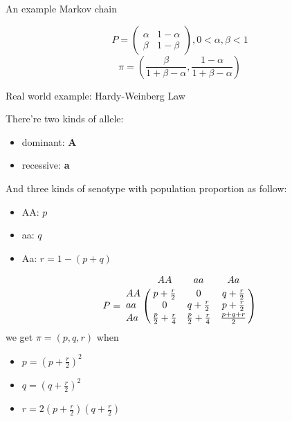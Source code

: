 \documentclass{beamer}
\begin{document}
\begin{frame}{An example Markov chain}
	\begin{example}
		\[
		P = 
		\begin{pmatrix}
			\alpha & 1 - \alpha \\
			\beta  & 1 - \beta
		\end{pmatrix},
		0 < \alpha, \beta < 1
		\]
		\[
		\pi = \left( \frac{\beta}{1+\beta-\alpha}, \frac{1-\alpha}{1+\beta-\alpha} \right) 
		\]
	\end{example}
\end{frame}

\begin{frame}{Real world example: Hardy-Weinberg Law}
	\begin{example}
		There're two kinds of allele: 
		\begin{itemize}
			\item dominant: \textbf{A}
			\item recessive: \textbf{a}
		\end{itemize}
		And three kinds of senotype with population proportion as follow:
		\begin{itemize}
			\item AA: $p$
			\item aa: $q$
			\item Aa: $r = 1 - (p + q)$
		\end{itemize}
	\end{example}
\end{frame}

\begin{frame}
	\begin{example}[cont.]
		\[
		P = 
		\bordermatrix{ ~ & AA                      & aa                      & Aa            \cr
			            AA & p+\frac{r}{2}           & 0                       & q+\frac{r}{2} \cr
			            aa & 0                       & q+\frac{r}{2}           & p+\frac{r}{2} \cr
			            Aa & \frac{p}{2}+\frac{r}{4} & \frac{p}{2}+\frac{r}{4} & \frac{p+q+r}{2} \cr}
		\]
		we get $\pi = (p, q, r)$ when
		\begin{itemize}
			\item $p = {\left( p + \frac{r}{2} \right)}^2$
			\item $q = {\left( q + \frac{r}{2} \right)}^2$
			\item $r = 2 \left( p + \frac{r}{2} \right)\left( q + \frac{r}{2} \right)$
		\end{itemize}
	\end{example}
\end{frame}
\end{document}
